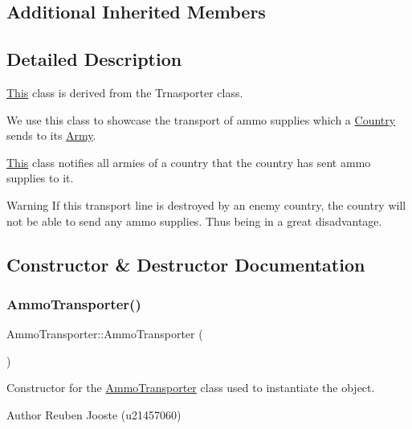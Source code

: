 \subsection*{Additional Inherited Members}


\subsection{Detailed Description}
\mbox{\hyperlink{class_this}{This}} class is derived from the Trnasporter class.
\begin{DoxyItemize}
\item We use this class to showcase the transport of ammo supplies which a \mbox{\hyperlink{class_country}{Country}} sends to its \mbox{\hyperlink{class_army}{Army}}.
\item \mbox{\hyperlink{class_this}{This}} class notifies all armies of a country that the country has sent ammo supplies to it. \begin{DoxyWarning}{Warning}
If this transport line is destroyed by an enemy country, the country will not be able to send any ammo supplies. Thus being in a great disadvantage. 
\end{DoxyWarning}

\end{DoxyItemize}

\subsection{Constructor \& Destructor Documentation}
\mbox{\label{class_ammo_transporter_a52f3a89dca9316f6b6fcc2ebb4be421b}} 
\subsubsection{\texorpdfstring{AmmoTransporter()}{AmmoTransporter()}}
{\footnotesize\ttfamily Ammo\+Transporter\+::\+Ammo\+Transporter (\begin{DoxyParamCaption}{ }\end{DoxyParamCaption})}



Constructor for the \mbox{\hyperlink{class_ammo_transporter}{Ammo\+Transporter}} class used to instantiate the object. 

\begin{DoxyAuthor}{Author}
Reuben Jooste (u21457060) 
\end{DoxyAuthor}
\mbox{\label{class_ammo_transporter_a2b4f1d8d346219cf172f839d19995bb3}} 
